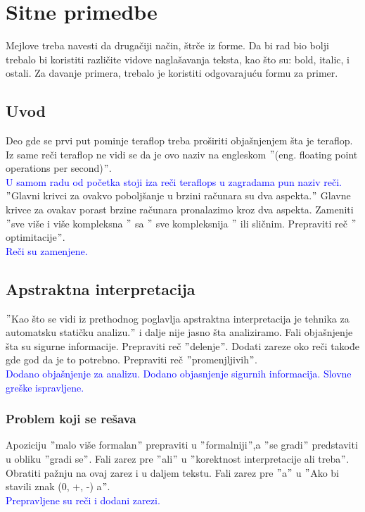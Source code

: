 \documentclass[a4paper]{report}
\newcommand{\odgovor}[1]{\textcolor{blue}{#1}}
\begin{document}
\section{Sitne primedbe}
Mejlove treba navesti da drugačiji način, štrče iz forme.
Da bi rad bio bolji trebalo bi koristiti različite vidove naglašavanja teksta, kao što su: bold, italic, i ostali. Za davanje primera, trebalo je koristiti odgovarajuću formu za primer.\\

\subsection{Uvod}
Deo gde se prvi put pominje teraflop treba proširiti objašnjenjem šta je teraflop. Iz same reči teraflop ne vidi se da je ovo naziv na engleskom $"$(eng. floating point operations per second)$"$.\\
\odgovor{U samom radu od početka stoji iza reči teraflops u zagradama pun naziv reči.}
\\
$"$Glavni krivci za ovakvo poboljšanje u brzini računara su dva aspekta.$"$
Glavne krivce za ovakav porast brzine računara pronalazimo kroz dva aspekta. Zameniti $"$sve više i više kompleksna $"$ sa $"$ sve kompleksnija $"$ ili sličnim. Prepraviti reč $"$optimitacije$"$. \\
\odgovor{Reči su zamenjene.}

\subsection{Apstraktna interpretacija}
$"$Kao što se vidi iz prethodnog poglavlja apstraktna interpretacija je
tehnika za automatsku statičku analizu.$"$ i dalje nije jasno šta analiziramo. Fali objašnjenje šta su sigurne informacije. Prepraviti reč $"$delenje$"$. Dodati zareze oko reči takođe gde god da je to potrebno. Prepraviti reč $"$promenjljivih$"$. \\
\odgovor{Dodano objašnjenje za analizu. Dodano objasnjenje sigurnih informacija. Slovne greške ispravljene.}

\subsubsection{Problem koji se rešava}
Apoziciju $"$malo više formalan$"$ prepraviti u $"$formalniji$"$,a $"$se gradi$"$ predstaviti u obliku $"$gradi se$"$. Fali zarez pre $"$ali$"$ u $"$korektnost interpretacije ali treba$"$. Obratiti pažnju na ovaj zarez i u daljem tekstu. Fali zarez pre $"$a$"$ u $"$Ako bi stavili znak (0, +, -) a$"$. \\
\odgovor{Prepravljene su reči i dodani zarezi.}
\end{document}
